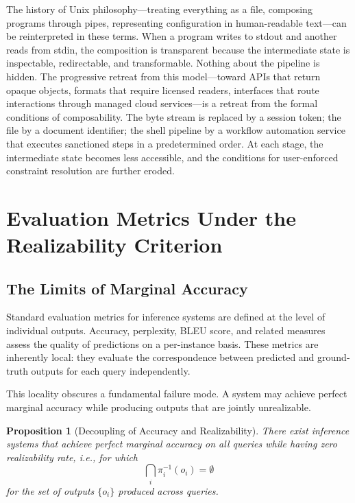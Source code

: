 \documentclass[12pt, oneside]{article}
\newtheorem{proposition}{Proposition}
\begin{document}
The history of Unix philosophy---treating everything as a file, composing programs through pipes, representing configuration in human-readable text---can be reinterpreted in these terms. When a program writes to stdout and another reads from stdin, the composition is transparent because the intermediate state is inspectable, redirectable, and transformable. Nothing about the pipeline is hidden. The progressive retreat from this model---toward APIs that return opaque objects, formats that require licensed readers, interfaces that route interactions through managed cloud services---is a retreat from the formal conditions of composability. The byte stream is replaced by a session token; the file by a document identifier; the shell pipeline by a workflow automation service that executes sanctioned steps in a predetermined order. At each stage, the intermediate state becomes less accessible, and the conditions for user-enforced constraint resolution are further eroded.

\section{Evaluation Metrics Under the Realizability Criterion}

\subsection{The Limits of Marginal Accuracy}

Standard evaluation metrics for inference systems are defined at the level of individual outputs. Accuracy, perplexity, BLEU score, and related measures assess the quality of predictions on a per-instance basis. These metrics are inherently local: they evaluate the correspondence between predicted and ground-truth outputs for each query independently.

This locality obscures a fundamental failure mode. A system may achieve perfect marginal accuracy while producing outputs that are jointly unrealizable.

\begin{proposition}[Decoupling of Accuracy and Realizability]
There exist inference systems that achieve perfect marginal accuracy on all queries while having zero realizability rate, i.e., for which
\begin{equation}
  \bigcap_i \pi_i^{-1}(o_i) = \emptyset
\end{equation}
for the set of outputs $\{o_i\}$ produced across queries.
\end{proposition}
\end{document}
